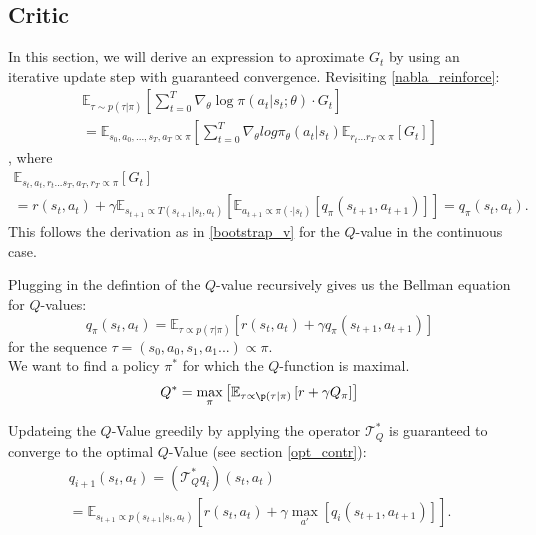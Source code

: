 \subsection{Critic}
In this section, we will derive an expression to aproximate $G_t$ by using an iterative update step with guaranteed convergence.
Revisiting \ref{nabla_reinforce}: 
\begin{equation}
    \begin{aligned}
        \mathbb{E}_{\tau \sim p(\tau | \pi)} \left[ \sum_{t=0}^T \nabla_{\theta} \log \pi(a_t|s_t;\theta) \cdot  G_t\right]\\
        = \mathbb{E}_{s_0, a_0, ... ,s_T, a_T \propto \pi} \left[
            \sum_{t=0}^{T}\nabla_{\theta} log \pi_{\theta}(a_t|s_t) \mathbb{E}_{r_t...r_T \propto \pi} \left[ G_t \right]
        \right]
    \end{aligned}
\end{equation}
, where 
\begin{equation}
    \begin{align}
        \mathbb{E}_{s_t, a_t, r_t...s_T, a_T, r_T \propto \pi} \left[ G_t \right] \\
        = r(s_t,a_t) + \gamma \mathbb{E}_{s_{t+1} \propto T(s_{t+1}|s_t, a_t)}\left[\mathbb{E}_{a_{t+1} \propto \pi(\cdot|s_t)}  \left[q_{\pi}(s_{t+1},a_{t+1})\right]  \right]
        = q_{\pi}(s_{t},a_{t}).
    \end{align}
\end{equation}
This follows the derivation as in \ref{bootstrap_v} for the $Q$-value in the continuous case.

Plugging in the defintion of the $Q$-value recursively gives us the Bellman equation for $Q$-values:
\begin{equation}
q_{\pi}(s_t, a_t) = \mathbb{E}_{\tau \propto p(\tau|\pi)} \left[ r(s_t,a_t) + \gamma q_{\pi}(s_{t+1}, a_{t+1})\right]
\end{equation}
for the sequence $\tau = (s_0,a_0, s_1, a_1...) \propto \pi$.\\
We want to find a policy $\pi^*$ for which the $Q$-function is maximal.
\begin{equation}
    Q^* = \max_{\pi} \left[\mathbb{E}_{\tau \propto \p(\tau|\pi)} \left[ r + \gamma Q_{\pi} \right]\right]
\end{equation}

Updateing the $Q$-Value greedily by applying the operator $\mathcal{T}_Q^*$ is guaranteed to converge to the optimal $Q$-Value (see section \ref{opt_contr}):
\begin{equation}
    \begin{aligned}
        q_{i+1}(s_t, a_t) = (\mathcal{T}_Q^* q_i)(s_t, a_t) \\
        =\mathbb{E}_{s_{t+1} \propto p(s_{t+1}|s_t, a_t)} \left[r(s_t, a_t) + \gamma  \max_{a'} \left[  q_i(s_{t+1}, a_{t + 1}) \right]\right].
    \end{aligned}
\end{equation}

